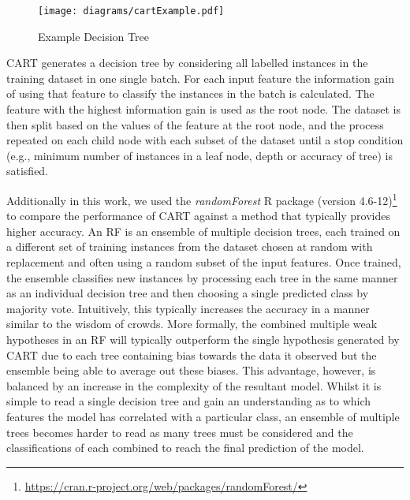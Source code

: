 \begin{figure}[h]
\centering
\texttt{[image: diagrams/cartExample.pdf]}
\caption{Example Decision Tree}
\label{fig:dtree}
\end{figure}

CART generates a decision tree by considering all labelled instances in the training dataset in one single batch. For each input feature the information gain of using that feature to classify the instances in the batch is calculated. The feature with the highest information gain is used as the root node. The dataset is then split based on the values of the feature at the root node, and the process repeated on each child node with each subset of the dataset until a stop condition (e.g., minimum number of instances in a leaf node, depth or accuracy of tree) is satisfied.  

Additionally in this work, we used the \textit{randomForest} R package {(version 4.6-12)}\footnote{\url{https://cran.r-project.org/web/packages/randomForest/}} to compare the performance of CART against a method that typically provides higher accuracy. An RF is an ensemble of multiple decision trees, each trained on a different set of training instances from the dataset chosen at random with replacement and often using a random subset of the input features. Once trained, the ensemble classifies new instances by processing each tree in the same manner as an individual decision tree and then choosing a single predicted class by majority vote. Intuitively, this typically increases the accuracy in a manner similar to the wisdom of crowds. More formally, the combined multiple weak hypotheses in an RF will typically outperform the single hypothesis generated by CART due to each tree containing bias towards the data it observed but the ensemble being able to average out these biases. This advantage, however, is balanced by an increase in the complexity of the resultant model. Whilst it is simple to read a single decision tree and gain an understanding as to which features the model has correlated with a particular class, an ensemble of multiple trees becomes harder to read as many trees must be considered and the classifications of each combined to reach the final prediction of the model.


